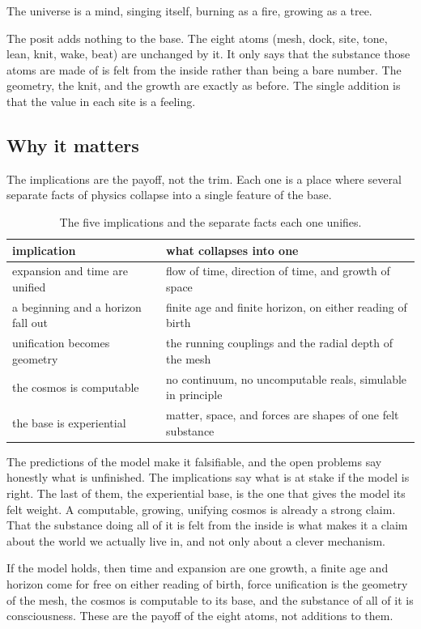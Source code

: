 \begin{principle}
The universe is a mind, singing itself, burning as a fire, growing as a tree.
\end{principle}

The posit adds nothing to the base. The eight atoms (mesh, dock, site, tone, lean, knit, wake, beat) are unchanged by it. It only says that the substance those atoms are made of is felt from the inside rather than being a bare number. The geometry, the knit, and the growth are exactly as before. The single addition is that the value in each site is a feeling.

\subsection{Why it matters}

The implications are the payoff, not the trim. Each one is a place where several separate facts of physics collapse into a single feature of the base.

\begin{table}[ht]
\centering
\begin{tabular}{@{}ll@{}}
\toprule
implication & what collapses into one \\
\midrule
expansion and time are unified & flow of time, direction of time, and growth of space \\
a beginning and a horizon fall out & finite age and finite horizon, on either reading of birth \\
unification becomes geometry & the running couplings and the radial depth of the mesh \\
the cosmos is computable & no continuum, no uncomputable reals, simulable in principle \\
the base is experiential & matter, space, and forces are shapes of one felt substance \\
\bottomrule
\end{tabular}
\caption{The five implications and the separate facts each one unifies.}
\label{tab:implications}
\end{table}

The predictions of the model make it falsifiable, and the open problems say honestly what is unfinished. The implications say what is at stake if the model is right. The last of them, the experiential base, is the one that gives the model its felt weight. A computable, growing, unifying cosmos is already a strong claim. That the substance doing all of it is felt from the inside is what makes it a claim about the world we actually live in, and not only about a clever mechanism.

\begin{result}
If the model holds, then time and expansion are one growth, a finite age and horizon come for free on either reading of birth, force unification is the geometry of the mesh, the cosmos is computable to its base, and the substance of all of it is consciousness. These are the payoff of the eight atoms, not additions to them.
\end{result}
